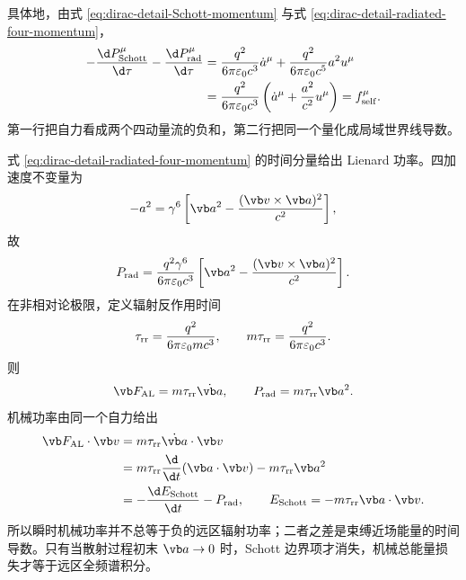 具体地，由式 \eqref{eq:dirac-detail-Schott-momentum} 与式 \eqref{eq:dirac-detail-radiated-four-momentum}，
\begin{align}
 -{\d P_{\mathrm{Schott}}^\mu\over\d\tau}
 -{\d P_{\mathrm{rad}}^\mu\over\d\tau}
 &={q^2\over6\pi\varepsilon_0c^3}\dot a^\mu
 +{q^2\over6\pi\varepsilon_0c^5}a^2u^\mu
 \notag\\
 &={q^2\over6\pi\varepsilon_0c^3}
 \left(\dot a^\mu+{a^2\over c^2}u^\mu\right)
 =f_{\mathrm{self}}^\mu.
 \label{eq:dirac-detail-ALD-Schott-rad-chain}
\end{align}
第一行把自力看成两个四动量流的负和，第二行把同一个量化成局域世界线导数。

式 \eqref{eq:dirac-detail-radiated-four-momentum} 的时间分量给出 Lienard 功率。四加速度不变量为
\begin{equation}
 -a^2
 =\gamma^6
 \left[
 \vb a^2-{(\vb v\times\vb a)^2\over c^2}
 \right],
 \label{eq:dirac-detail-four-acc-invariant}
\end{equation}
故
\begin{equation}
 P_{\mathrm{rad}}
 ={q^2\gamma^6\over6\pi\varepsilon_0c^3}
 \left[
 \vb a^2-{(\vb v\times\vb a)^2\over c^2}
 \right].
 \label{eq:dirac-detail-Lienard-power}
\end{equation}
在非相对论极限，定义辐射反作用时间
\begin{equation}
 \tau_{\mathrm{rr}}
 ={q^2\over6\pi\varepsilon_0mc^3},
 \qquad
 m\tau_{\mathrm{rr}}={q^2\over6\pi\varepsilon_0c^3}.
 \label{eq:dirac-rr-timescale}
\end{equation}
则
\begin{equation*}
 \vb F_{\mathrm{AL}}=m\tau_{\mathrm{rr}}\dot{\vb a},
 \qquad
 P_{\mathrm{rad}}=m\tau_{\mathrm{rr}}\vb a^2.
\end{equation*}
机械功率由同一个自力给出
\begin{align}
 \vb F_{\mathrm{AL}}\cdot\vb v
 &=m\tau_{\mathrm{rr}}\dot{\vb a}\cdot\vb v
 \notag\\
 &=m\tau_{\mathrm{rr}}{\d\over\d t}(\vb a\cdot\vb v)
 -m\tau_{\mathrm{rr}}\vb a^2
 \notag\\
 &=-{\d E_{\mathrm{Schott}}\over\d t}-P_{\mathrm{rad}},
 \qquad
 E_{\mathrm{Schott}}=-m\tau_{\mathrm{rr}}\vb a\cdot\vb v.
 \label{eq:dirac-detail-Schott-energy}
\end{align}
所以瞬时机械功率并不总等于负的远区辐射功率；二者之差是束缚近场能量的时间导数。只有当散射过程初末 $\vb a\to0$ 时，Schott 边界项才消失，机械总能量损失才等于远区全频谱积分。

